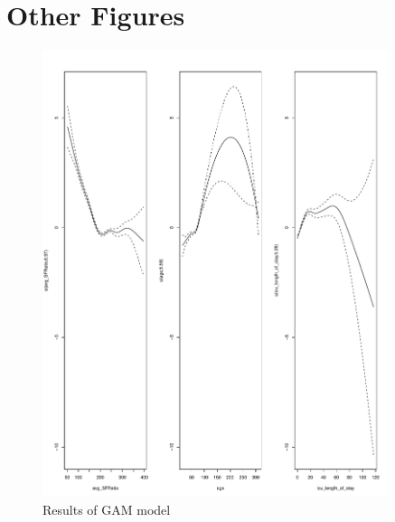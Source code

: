
\chapter{Other Figures} %

\label{AppendixA} %

\begin{figure}[H]
  \centering
    \includegraphics[width=0.9\textwidth]{figures/GAM.pdf}
  \caption{Results of GAM model}
  \label{fig:GAM_All}
\end{figure}